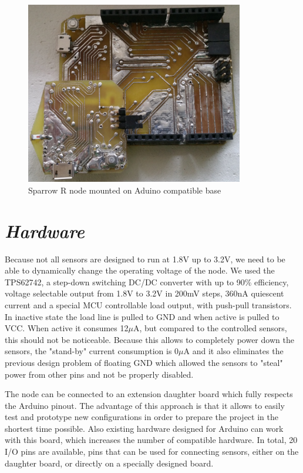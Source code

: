 \begin{figure}[ht] \centering
\includegraphics[width=0.85\textwidth]{img/base-with-sensor.jpg}
\caption{Sparrow R node mounted on Aduino compatible base}
\end{figure}

\section{\textit{Hardware}}
Because not all sensors are designed to run at 1.8V up to 3.2V, we need to be able to dynamically
change the operating voltage of the node. We used the TPS62742, a step-down switching DC/DC converter
with up to 90\% efficiency, voltage selectable output from 1.8V to 3.2V in 200mV steps, 360nA
quiescent current and a special MCU controllable load output, with push-pull transistors. In
inactive state the load line is pulled to GND and when active is pulled to VCC. When active it
consumes 12${\mu}$A, but compared to the controlled sensors, this should not be noticeable. Because this
allows to completely power down the sensors, the "stand-by" current consumption is 0${\mu}$A and it also
eliminates the previous design problem of floating GND which allowed the sensors to "steal" power
from other pins and not be properly disabled.

The node can be connected to an extension daughter board which fully respects the Arduino pinout.
The advantage of this approach is that it allows to easily test and prototype new configurations in
order to prepare the project in the shortest time possible. Also existing hardware designed for Arduino can work with this board,
which increases the number of compatible hardware. In total, 20 I/O pins are available, pins that
can be used for connecting sensors, either on the daughter board, or directly on a specially
designed board.

